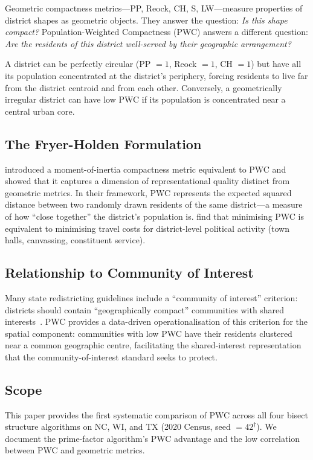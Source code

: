 Geometric compactness metrics---PP, Reock, CH, S, LW---measure properties
of district shapes as geometric objects.
They answer the question: \emph{Is this shape compact?}
Population-Weighted Compactness (PWC) answers a different question:
\emph{Are the residents of this district well-served by their geographic arrangement?}

A district can be perfectly circular (PP $= 1$, Reock $= 1$, CH $= 1$)
but have all its population concentrated at the district's periphery,
forcing residents to live far from the district centroid and from each other.
Conversely, a geometrically irregular district can have low PWC if
its population is concentrated near a central urban core.

\subsection{The Fryer-Holden Formulation}

\citet{fryer2011measuring} introduced a moment-of-inertia compactness metric
equivalent to PWC and showed that it captures a dimension of representational
quality distinct from geometric metrics.
In their framework, PWC represents the expected squared distance between two
randomly drawn residents of the same district---a measure of how ``close together''
the district's population is.
\citet{fryer2011measuring} find that minimising PWC is equivalent to minimising
travel costs for district-level political activity (town halls, canvassing,
constituent service).

\subsection{Relationship to Community of Interest}

Many state redistricting guidelines include a ``community of interest'' criterion:
districts should contain ``geographically compact'' communities with shared
interests~\citep{ncsl2021criteria}.
PWC provides a data-driven operationalisation of this criterion for the spatial
component: communities with low PWC have their residents clustered near a
common geographic centre, facilitating the shared-interest representation
that the community-of-interest standard seeks to protect.

\subsection{Scope}

This paper provides the first systematic comparison of PWC across all four
bisect structure algorithms on NC, WI, and TX (2020 Census, seed $= 42^\dagger$).
We document the prime-factor algorithm's PWC advantage and the low correlation
between PWC and geometric metrics.
